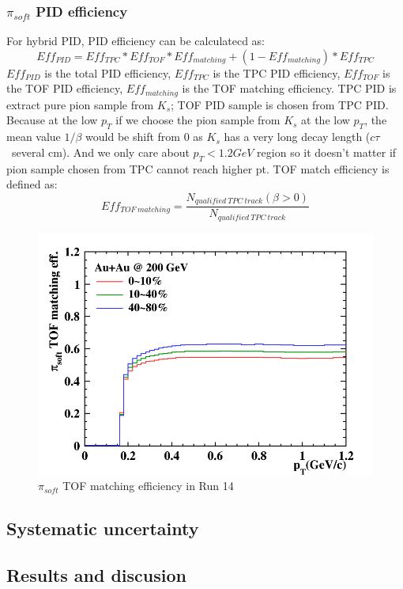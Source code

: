\subsubsection{$\pi_{soft}$ PID efficiency}
For hybrid PID, PID efficiency can be calculatecd as:
\begin{equation}
Eff_{PID} = Eff_{TPC}*Eff_{TOF}*Eff_{matching}+(1-Eff_{matching})*Eff_{TPC}
\end{equation}
$Eff_{PID}$ is the total PID efficiency, $Eff_{TPC}$ is the TPC PID efficiency, $Eff_{TOF}$ is the TOF PID efficiency, $Eff_{matching}$ is the TOF matching efficiency.
TPC PID is extract pure pion sample from $K_{s}$;
TOF PID sample is chosen from TPC PID. Because at the low $p_{T}$ if we choose the pion sample from $K_{s}$ at the low $p_{T}$, the mean value $1/\beta$ would be shift from 0 as $K_{s}$ has a very long decay length ($c\tau$~several cm). And we only care about $p_{T}<1.2GeV$ region so it doesn't matter if pion sample chosen from TPC cannot reach higher pt.
TOF match efficiency is defined as:
\begin{equation}
Eff_{TOF~matching}=\frac{N_{qualified~TPC~track}(\beta>0)}{N_{qualified~TPC~track}}
\end{equation}
\begin{figure}[h!]
	\centering
	\includegraphics[scale=0.35]{dstarplots/piTofeff.png}
	\caption{$\pi_{soft}$ TOF matching efficiency in Run 14}
	\label{fig:spitof14}
\end{figure}

	\subsection{Systematic uncertainty}
	
	\subsection{Results and discusion}
	


